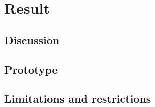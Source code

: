 \section{Result}
\subsection{Discussion}
\subsection{Prototype}
\subsection{Limitations and restrictions}